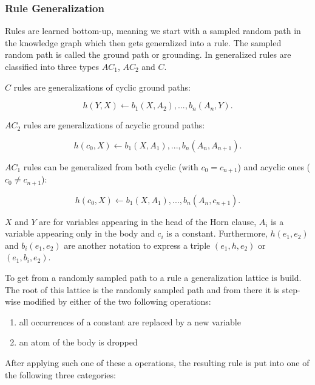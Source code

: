 \subsubsection{Rule Generalization}
\label{cha:anyburl_generalization}
Rules are learned bottom-up, meaning we start with a sampled random path in the knowledge graph which then gets generalized into a rule. The sampled random path is called the ground path or grounding. In \cite{meilicke_anytime_2019} generalized rules are classified into three types $AC_1$, $AC_2$ and $C$. 

$C$ rules are generalizations of cyclic 
ground paths:

\begin{equation}
h(Y,X) \leftarrow b_1(X, A_2), ..., b_n(A_n,Y).
\end{equation}

$AC_2$ rules are generalizations of acyclic ground paths:

\begin{equation}
h(c_0,X) \leftarrow b_1(X, A_1), ..., b_n(A_n,A_{n+1}).
\end{equation}
	
$AC_1$ rules can be generalized from both cyclic (with $c_0=c_{n+1}$) and acyclic ones ($c_0\neq c_{n+1}$):

\begin{equation}
h(c_0,X) \leftarrow b_1(X, A_1), ..., b_n(A_n,c_{n+1}).
\end{equation}

$X$ and $Y$ are for variables appearing in the head of the Horn clause, $A_i$ is a variable appearing only in the body and $c_i$ is a constant. Furthermore, $h(e_1,e_2)$ and $b_i(e_1,e_2)$ are another notation to express a triple $(e_1, h, e_2)$ or $(e_1, b_i, e_2)$. 

To get from a randomly sampled path to a rule a generalization lattice is build. The root of this lattice is the randomly sampled path and from there it is step-wise modified by either of the two following operations: 

\begin{enumerate}
\item all occurrences of a constant are replaced by a new variable 
\item an atom of the body is dropped
\end{enumerate}

After applying such one of these a operations, the resulting rule is put into one of the following three categories:

